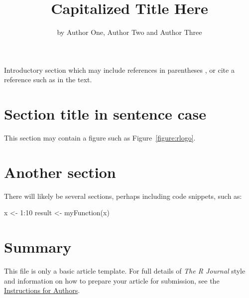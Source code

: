 \title{Capitalized Title Here}
\author{by Author One, Author Two and Author Three}

\maketitle


Introductory section which may include references in parentheses
\citep{R}, or cite a reference such as \citet{R} in the text.

\section{Section title in sentence case}

This section may contain a figure such as Figure~\ref{figure:rlogo}.


\section{Another section}

There will likely be several sections, perhaps including code snippets, such as:

\begin{example}
  x <- 1:10
  result <- myFunction(x)
\end{example}

\section{Summary}

This file is only a basic article template. For full details of \emph{The R Journal} style and information on how to prepare your article for submission, see the \href{http://journal.r-project.org/latex/RJauthorguide.pdf}{Instructions for Authors}.



\address{Author One\\
  Affiliation\\
  Address\\
  Country}

\address{Author Two\\
  Affiliation\\
  Address\\
  Country}

\address{Author Three\\
  Affiliation\\
  Address\\
  Country}
